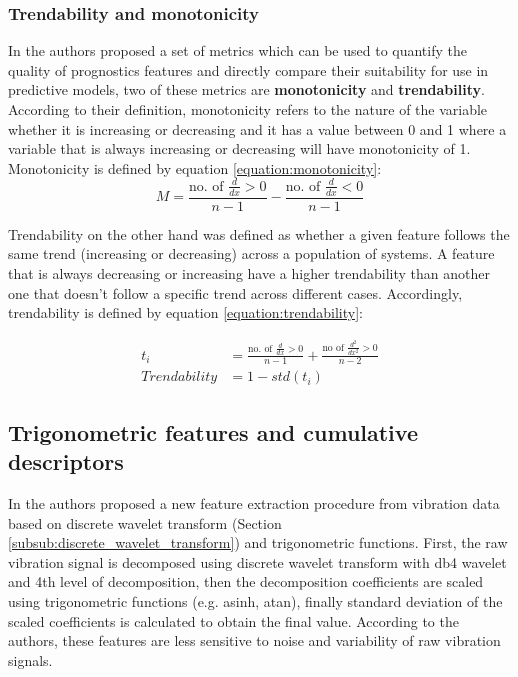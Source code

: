 \subsubsection{Trendability and monotonicity}%
\label{subsub:trendability_and_monotonicity}
In \cite{coble2009} the authors proposed a set of metrics which can be used to quantify the quality of prognostics features and directly compare their suitability for use in predictive models, two of these metrics are \textbf{monotonicity} and \textbf{trendability}. According to their definition, monotonicity refers to the nature of the variable whether it is increasing or decreasing and it has a value between 0 and 1 where a variable that is always increasing or decreasing will have monotonicity of 1. Monotonicity is defined by equation \ref{equation:monotonicity}: 
\begin{equation}
	M=\frac{\text{no. of }\frac{d}{dx} > 0}{n-1} - \frac{\text{no. of }\frac{d}{dx} < 0}{n-1}
\label{equation:monotonicity}
\end{equation}

Trendability on the other hand was defined as whether a given feature follows the same trend (increasing or decreasing) across a population of systems. A feature that is always decreasing or increasing have a higher trendability than another one that doesn't follow a specific trend across different cases. Accordingly, trendability is defined by equation \ref{equation:trendability}:  

\begin{equation}
	\begin{aligned}
		t_i&= \frac{\text{no. of }\frac{d}{dx}>0}{n-1}+\frac{\text{no of } \frac{d^2}{dx^2}>0}{n-2}\\
Trendability&=1-std(t_i)
	\end{aligned}
	\label{equation:trendability}
\end{equation}

\subsection{Trigonometric features and cumulative descriptors}%
\label{sub:trigonometric_features}
In \cite{javed2013} the authors proposed a new feature extraction procedure from vibration data based on discrete wavelet transform (Section \ref{subsub:discrete_wavelet_transform}) and trigonometric functions. First, the raw vibration signal is decomposed using discrete wavelet transform with db4 wavelet and 4th level of decomposition, then the decomposition coefficients are scaled using trigonometric functions (e.g. asinh, atan), finally standard deviation of the scaled coefficients is calculated to obtain the final value. According to the authors, these features are less sensitive to noise and variability of raw vibration signals. 


